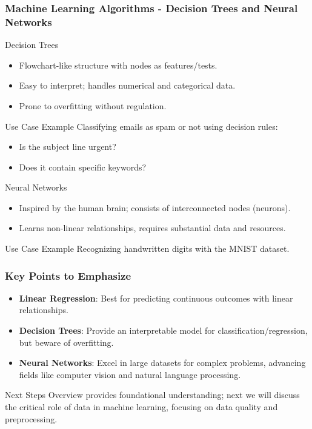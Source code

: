 \documentclass{beamer}
\begin{document}
\begin{frame}[fragile]
    \frametitle{Machine Learning Algorithms - Decision Trees and Neural Networks}
    
    \begin{block}{Decision Trees}
        \begin{itemize}
            \item Flowchart-like structure with nodes as features/tests.
            \item Easy to interpret; handles numerical and categorical data.
            \item Prone to overfitting without regulation.
        \end{itemize}
    \end{block}
    
    \begin{block}{Use Case Example}
        Classifying emails as spam or not using decision rules:
        \begin{itemize}
            \item Is the subject line urgent?
            \item Does it contain specific keywords?
        \end{itemize}
    \end{block}

    \begin{block}{Neural Networks}
        \begin{itemize}
            \item Inspired by the human brain; consists of interconnected nodes (neurons).
            \item Learns non-linear relationships, requires substantial data and resources.
        \end{itemize}
    \end{block}

    \begin{block}{Use Case Example}
        Recognizing handwritten digits with the MNIST dataset.
    \end{block}
\end{frame}

\begin{frame}[fragile]
    \frametitle{Key Points to Emphasize}
    \begin{itemize}
        \item \textbf{Linear Regression}: Best for predicting continuous outcomes with linear relationships.
        \item \textbf{Decision Trees}: Provide an interpretable model for classification/regression, but beware of overfitting.
        \item \textbf{Neural Networks}: Excel in large datasets for complex problems, advancing fields like computer vision and natural language processing.
    \end{itemize}
    
    \begin{block}{Next Steps}
        Overview provides foundational understanding; next we will discuss the critical role of data in machine learning, focusing on data quality and preprocessing.
    \end{block}
\end{frame}
\end{document}
